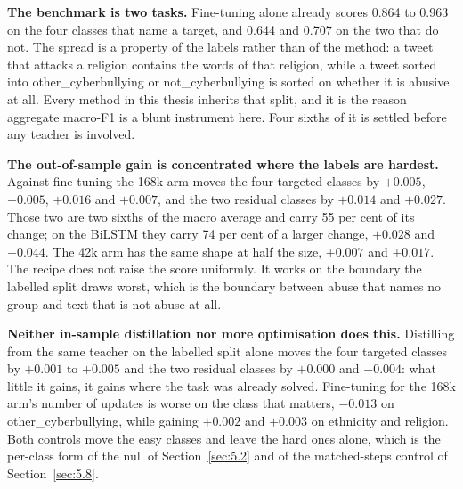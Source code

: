 \textbf{The benchmark is two tasks.} Fine-tuning alone already scores 0.864 to 0.963 on the four
classes that name a target, and 0.644 and 0.707 on the two that do not. The spread is a property of
the labels rather than of the method: a tweet that attacks a religion contains the words of that
religion, while a tweet sorted into other\_cyberbullying or not\_cyberbullying is sorted on whether
it is abusive at all. Every method in this thesis inherits that split, and it is the reason aggregate
macro-F1 is a blunt instrument here. Four sixths of it is settled before any teacher is involved.

\textbf{The out-of-sample gain is concentrated where the labels are hardest.} Against fine-tuning the
168k arm moves the four targeted classes by $+0.005$, $+0.005$, $+0.016$ and $+0.007$, and the two
residual classes by $+0.014$ and $+0.027$. Those two are two sixths of the macro average and carry 55
per cent of its change; on the BiLSTM they carry 74 per cent of a larger change, $+0.028$ and
$+0.044$. The 42k arm has the same shape at half the size, $+0.007$ and $+0.017$. The recipe does not
raise the score uniformly. It works on the boundary the labelled split draws worst, which is the
boundary between abuse that names no group and text that is not abuse at all.

\textbf{Neither in-sample distillation nor more optimisation does this.} Distilling from the same
teacher on the labelled split alone moves the four targeted classes by $+0.001$ to $+0.005$ and the
two residual classes by $+0.000$ and $-0.004$: what little it gains, it gains where the task was
already solved. Fine-tuning for the 168k arm's number of updates is worse on the class that matters,
$-0.013$ on other\_cyberbullying, while gaining $+0.002$ and $+0.003$ on ethnicity and religion.
Both controls move the easy classes and leave the hard ones alone, which is the per-class form of the
null of Section~\ref{sec:5.2} and of the matched-steps control of Section~\ref{sec:5.8}.

